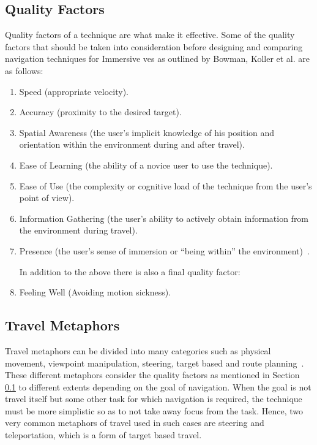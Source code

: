 \subsection{Quality Factors}
\label{subsection RW Navigation: Quality Factors}
Quality factors of a technique are what make it effective. Some of the quality factors that should be taken into consideration before designing and comparing navigation techniques for Immersive \acrshort{ve}s as outlined by Bowman, Koller et al. are as follows:
\begin{enumerate}
	\item Speed (appropriate velocity).
	\item Accuracy (proximity to the desired target).
	\item Spatial Awareness (the user’s implicit knowledge of his	position and orientation within the environment during
	and after travel).
	\item Ease of Learning (the ability of a novice user to use the	technique).
	\item Ease of Use (the complexity or cognitive load of the
	technique from the user’s point of view).
	\item Information Gathering (the user’s ability to actively
	obtain information from the environment during travel).
	\item Presence (the user’s sense of immersion or “being
	within” the environment)~\cite{Bowman1997}.
	
	In addition to the above there is also a final quality factor:
	\item Feeling Well (Avoiding motion sickness).
\end{enumerate}

\subsection{Travel Metaphors}
\label{subsection RW Navigation: Travel Metaphors}
Travel metaphors can be divided into many categories such as physical movement, viewpoint manipulation, steering, target based and route planning~\cite{Bowman2001}. These different metaphors consider the quality factors as mentioned in Section \ref{subsection RW Navigation: Quality Factors} to different extents depending on the goal of navigation. When the goal is not travel itself but some other task for which navigation is required, the technique must be more simplistic so as to not take away focus from the task. Hence, two very common metaphors of travel used in such cases are steering and teleportation, which is a form of target based travel.

